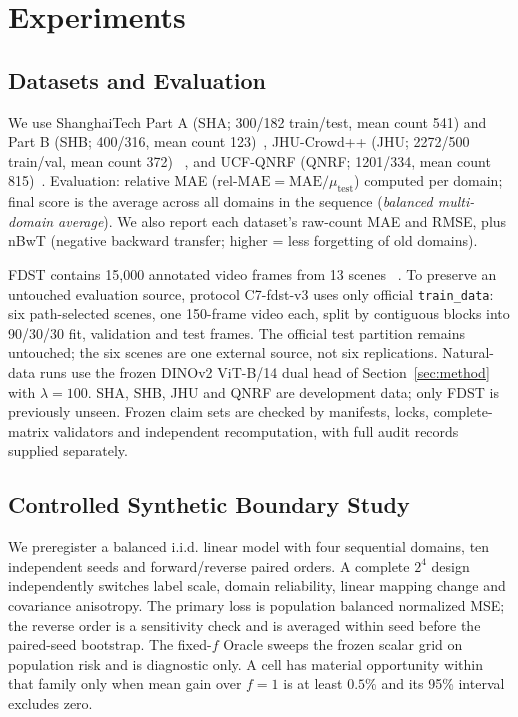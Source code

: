 \documentclass[10pt]{article}
\newcommand{\relmae}{\text{rel-MAE}}
\begin{document}
\section{Experiments}
\label{sec:experiments}

\subsection{Datasets and Evaluation}

We use ShanghaiTech Part A (SHA; 300/182 train/test, mean count 541) and
Part B (SHB; 400/316, mean count 123)~\citep{zhang2016shanghaitech},
JHU-Crowd++ (JHU; 2272/500 train/val, mean count 372)
~\citep{sindagi2019jhu}, and UCF-QNRF (QNRF; 1201/334, mean count
815)~\citep{idrees2018qnrf}.
Evaluation: relative MAE ($\relmae = \mathrm{MAE}/\mu_{\mathrm{test}}$)
computed per domain; final score is the average across all domains in
the sequence (\emph{balanced multi-domain average}).
We also report each dataset's raw-count MAE and RMSE, plus nBwT
(negative backward transfer; higher = less forgetting of old domains).

FDST contains 15,000 annotated video frames from 13 scenes
~\citep{fang2019lstn}.  To preserve an untouched evaluation source, protocol
C7-fdst-v3 uses only official \texttt{train\_data}: six path-selected scenes,
one 150-frame video each, split by contiguous blocks into 90/30/30 fit,
validation and test frames.  The official test partition remains untouched;
the six scenes are one external source, not six replications.  Natural-data
runs use the frozen DINOv2 ViT-B/14 dual head of Section~\ref{sec:method}
with $\lambda=100$.  SHA, SHB, JHU and QNRF are development data; only FDST
is previously unseen.  Frozen claim sets are checked by manifests, locks,
complete-matrix validators and independent recomputation, with full audit
records supplied separately.

\subsection{Controlled Synthetic Boundary Study}

We preregister a balanced i.i.d. linear model with four sequential domains,
ten independent seeds and forward/reverse paired orders.  A complete $2^4$
design independently switches label scale, domain reliability, linear mapping
change and covariance anisotropy. The primary loss is population balanced
normalized MSE; the reverse order is a sensitivity check and is averaged
within seed before the paired-seed bootstrap. The fixed-$f$ Oracle sweeps the
frozen scalar grid on population risk and is diagnostic only. A cell has
material opportunity within that family only when mean gain over $f=1$ is at
least $0.5\%$ and its 95\% interval excludes zero.
\end{document}
